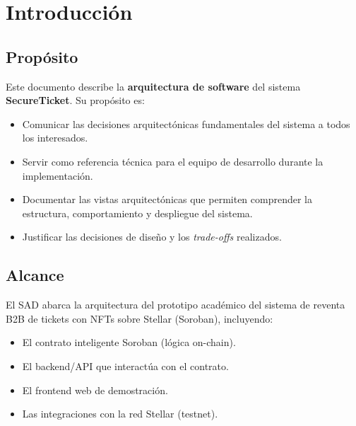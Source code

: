 \documentclass[12pt,oneside]{article}
\newcommand{\shortname}{SecureTicket}
\begin{document}
\newpage

\tableofcontents
\newpage
\listoffigures
\listoftables
\clearpage


\section{Introducción}
\label{sec:introduccion}

\subsection{Propósito}
\label{subsec:proposito}

Este documento describe la \textbf{arquitectura de software} del sistema \textbf{\shortname}. Su propósito es:

\begin{itemize}
  \item Comunicar las decisiones arquitectónicas fundamentales del sistema a todos los interesados.
  \item Servir como referencia técnica para el equipo de desarrollo durante la implementación.
  \item Documentar las vistas arquitectónicas que permiten comprender la estructura, comportamiento y despliegue del sistema.
  \item Justificar las decisiones de diseño y los \textit{trade-offs} realizados.
\end{itemize}

\subsection{Alcance}
\label{subsec:alcance}

El SAD abarca la arquitectura del prototipo académico del sistema de reventa B2B de tickets con NFTs sobre Stellar (Soroban), incluyendo:

\begin{itemize}
  \item El contrato inteligente Soroban (lógica on-chain).
  \item El backend/API que interactúa con el contrato.
  \item El frontend web de demostración.
  \item Las integraciones con la red Stellar (testnet).
\end{itemize}
\end{document}
